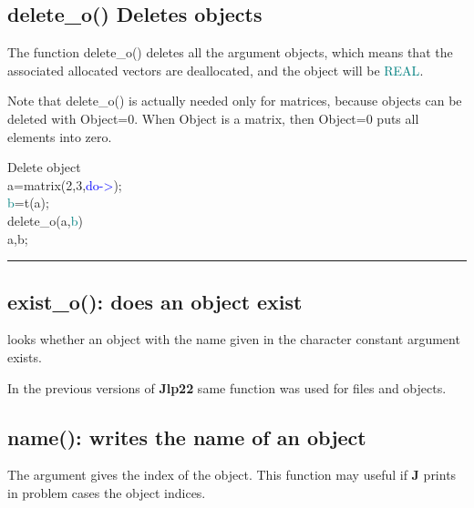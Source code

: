{\subsection{\textcolor{VioletRed}{delete\_o}() Deletes objects} 
\label{delete_o} 
The function \textcolor{VioletRed}{delete\_o}() deletes all the argument objects, which means that the 
associated allocated vectors are deallocated, and the object will be \textcolor{teal}{REAL}. 
\begin{note} 
Note that \textcolor{VioletRed}{delete\_o}() is actually needed only for matrices, because objects 
can be deleted with Object=0. When Object is a matrix, then Object=0 puts all elements 
into zero. 
\end{note} 
\singlespacing 
\begin{example}[deleteoex]Delete object\\ 
\label{deleteoex} 
\noindent a=\textcolor{VioletRed}{matrix}(2,3,\textcolor{blue}{do->});\\ 
\textcolor{teal}{b}=\textcolor{VioletRed}{t}(a);\\ 
\textcolor{VioletRed}{delete\_o}(a,\textcolor{teal}{b})\\ 
a,b;\\ 
\end{example} 
\vspace{-7mm} \rule{5cm}{0.1pt} 
\onehalfspacing 
\subsection{\textcolor{VioletRed}{exist\_o}(): does an object exist} 
\label{existo} 
looks whether an object with the name given in 
the character constant  argument exists. 
\begin{note} 
In the previous versions of \textbf{Jlp22} same function was used for files and objects. 
\end{note} 
\subsection{\textcolor{VioletRed}{name}(): writes the name of an object} 
\label{name} 
The argument gives the index of the object. This function 
may useful if \textbf{J} prints in problem cases the object indices. 
}
